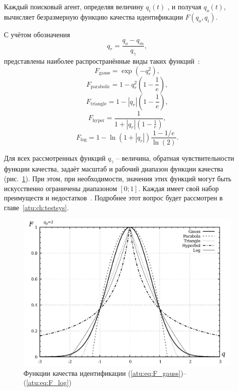 Каждый поисковый агент, определяя величину $q_{i}(t)$ , и получая $q_o(t)$,
вычисляет безразмерную функцию качества идентификации
$F(q_o,q_i)$.

С учётом обозначения
%
\[
  q_r = \frac{q_o - q_m}{q_\gamma},
\]
%
\noindent
представлены наиболее распространённые виды таких функций~\cite{atu_ISDMCI2016}:
%
\begin{equation}
  F_{\mathrm{gauss}} = \exp( - q_r^2 ),
\label{atu:eq:F_gauss}
\end{equation}
%
\begin{equation}
  F_{\mathrm{parabolic}} = 1 - q_r^2 \left( 1 - \frac{1}{e} \right),
\label{atu:eq:F_parabolic}
\end{equation}
%
\begin{equation}
  F_{\mathrm{triangle}} = 1 - |q_r| \left( 1 - \frac{1}{e} \right),
\label{atu:eq:F_triangle}
\end{equation}
%
\begin{equation}
  F_{\mathrm{hyper}} = \frac{1}{ 1 + |q_r| \left( 1 - \frac{1}{e} \right)},
\label{atu:eq:F_hyper}
\end{equation}
%
\begin{equation}
  F_{\mathrm{log}} = 1 - \ln \left( 1 + |q_r| \right) \frac{1-1/e}{\ln(2)}.
\label{atu:eq:F_log}
\end{equation}

Для всех рассмотренных функций $q_\gamma$ -- величина, обратная чувствительности
функции качества, задаёт масштаб и рабочий диапазон функции качества (рис.~\ref{atu:f:F_types}).
При этом, при необходимости, значения этих функций могут быть искусственно ограничены диапазоном $[0;1]$.
Каждая имеет свой набор преимуществ и недостатков~\cite{atu_ISDMCI2016}.
Подробнее этот вопрос будет рассмотрен в главе~\ref{atu:ch:testsys}.

\begin{figure}[htb!]
  \centerline{\includegraphics[width=45\TW]{p/F_types.png} }
  \caption{Функции качества идентификации (\ref{atu:eq:F_gauss})--(\ref{atu:eq:F_log})}
  \label{atu:f:F_types}
\end{figure}

